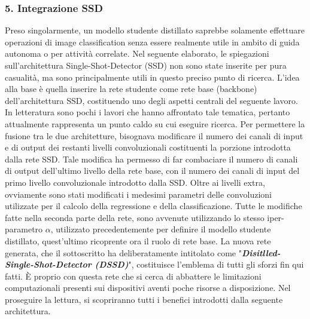 \subsubsection{5. Integrazione SSD}
Preso singolarmente, un modello studente distillato saprebbe solamente effettuare operazioni di image classification senza essere realmente utile in ambito di guida autonoma o per attività correlate. Nel seguente elaborato, le spiegazioni sull'architettura Single-Shot-Detector (SSD) non sono state inserite per pura casualità, ma sono principalmente utili in questo preciso punto di ricerca. L'idea alla base è quella inserire la rete studente come rete base (backbone) dell'architettura SSD, costituendo uno degli aspetti centrali del seguente lavoro. In letteratura sono pochi i lavori che hanno affrontato tale tematica, pertanto attualmente rappresenta un punto caldo su cui eseguire ricerca.
Per permettere la fusione tra le due architetture, bisognava modificare il numero dei canali di input e di output dei restanti livelli convoluzionali costituenti la porzione introdotta dalla rete SSD. Tale modifica ha permesso di far combaciare il numero di canali di output dell'ultimo livello della rete base, con il numero dei canali di input del primo livello convoluzionale introdotto dalla SSD. Oltre ai livelli extra, ovviamente sono stati modificati i medesimi parametri delle convoluzioni utilizzate per il calcolo della regressione e della classificazione. Tutte le modifiche fatte nella seconda parte della rete, sono avvenute utilizzando lo stesso iper-parametro $\alpha$, utilizzato precedentemente per definire il modello studente distillato, quest'ultimo ricoprente ora il ruolo di rete base. 
La nuova rete generata, che il sottoscritto ha deliberatamente intitolato come "{\bfseries{\emph{Disitlled-Single-Shot-Detector (DSSD)}}}", costituisce l'emblema di tutti gli sforzi fin qui fatti. È proprio con questa rete che si cerca di abbattere le limitazioni computazionali presenti sui dispositivi aventi poche risorse a disposizione. Nel proseguire la lettura, si scopriranno tutti i benefici introdotti dalla seguente architettura.

